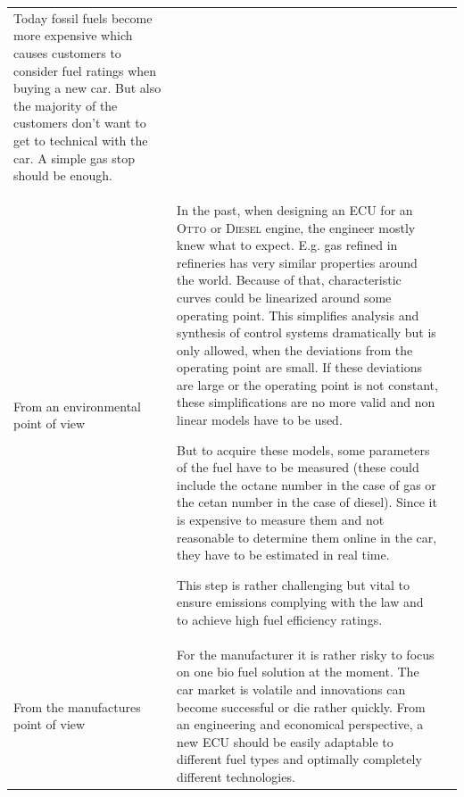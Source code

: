 \documentclass[12pt,a4paper,numbers=noenddot]{scrartcl}
\begin{document}
\begin{xtabular}{|p{3.8cm}|p{8.3cm}|p{4.2cm}|}
	Today fossil fuels become more expensive which causes customers to consider fuel ratings when buying a new car. But also the majority of the customers don't want to get to technical with the car. A simple gas stop should be enough.
	&
	
	\\
	From an environmental point of view
	&
	In the past, when designing an ECU for an \textsc{Otto} or \textsc{Diesel} engine, the engineer mostly knew what to expect. E.g. gas refined in refineries has very similar properties around the world. Because of that, characteristic curves could be linearized around some operating point. This simplifies analysis and synthesis of control systems dramatically but is only allowed, when the deviations from the operating point are small. If these deviations are large or the operating point is not constant, these simplifications are no more valid and non linear models have to be used.
	
	But to acquire these models, some parameters of the fuel have to be measured (these could include the octane number in the case of gas or the cetan number in the case of diesel). Since it is expensive to measure them and not reasonable to determine them online in the car, they have to be estimated in real time.
	
	This step is rather challenging but vital to ensure emissions complying with the law and to achieve high fuel efficiency ratings.
	&
	\\
	From the manufactures point of view
	&
	For the manufacturer it is rather risky to focus on one bio fuel solution at the moment. The car market is volatile and innovations can become successful or die rather quickly. From an engineering and economical perspective, a new ECU should be easily adaptable to different fuel types and optimally completely different technologies.
	&
	

\end{xtabular}
\end{document}
